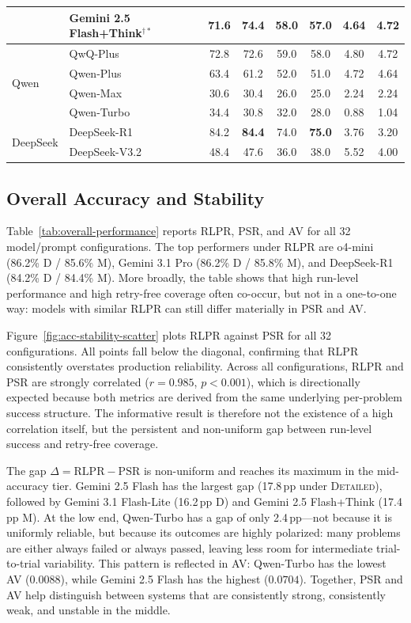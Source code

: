 \documentclass{article}
\begin{document}
\begin{table}[t]
{\begin{tabular}{llcccccc}
  & Gemini 2.5 Flash+Think$^{\dagger*}$ & 71.6 & 74.4 & 58.0 & 57.0 & 4.64 & 4.72 \\
\midrule
\multirow{4}{*}{Qwen}
  & QwQ-Plus   & 72.8 & 72.6 & 59.0 & 58.0 & 4.80 & 4.72 \\
  & Qwen-Plus  & 63.4 & 61.2 & 52.0 & 51.0 & 4.72 & 4.64 \\
  & Qwen-Max   & 30.6 & 30.4 & 26.0 & 25.0 & 2.24 & 2.24 \\
  & Qwen-Turbo & 34.4 & 30.8 & 32.0 & 28.0 & 0.88 & 1.04 \\
\midrule
\multirow{2}{*}{DeepSeek}
  & DeepSeek-R1   & 84.2 & \textbf{84.4} & 74.0 & \textbf{75.0} & 3.76 & 3.20 \\
  & DeepSeek-V3.2 & 48.4 & 47.6 & 36.0 & 38.0 & 5.52 & 4.00 \\
\bottomrule
\end{tabular}
}
\end{table}

\subsection{Overall Accuracy and Stability}
Table~\ref{tab:overall-performance} reports RLPR, PSR, and AV for all 32 model/prompt configurations. The top performers under RLPR are o4-mini (86.2\% D / 85.6\% M), Gemini 3.1 Pro (86.2\% D / 85.8\% M), and DeepSeek-R1 (84.2\% D / 84.4\% M). More broadly, the table shows that high run-level performance and high retry-free coverage often co-occur, but not in a one-to-one way: models with similar RLPR can still differ materially in PSR and AV.

Figure~\ref{fig:acc-stability-scatter} plots RLPR against PSR for all 32 configurations. All points fall below the diagonal, confirming that RLPR consistently overstates production reliability. Across all configurations, RLPR and PSR are strongly correlated ($r=0.985$, $p<0.001$), which is directionally expected because both metrics are derived from the same underlying per-problem success structure. The informative result is therefore not the existence of a high correlation itself, but the persistent and non-uniform gap between run-level success and retry-free coverage.

The gap $\Delta = \mathrm{RLPR} - \mathrm{PSR}$ is non-uniform and reaches its maximum in the mid-accuracy tier. Gemini 2.5 Flash has the largest gap (17.8\,pp under \textsc{Detailed}), followed by Gemini 3.1 Flash-Lite (16.2\,pp D) and Gemini 2.5 Flash+Think (17.4\,pp M). At the low end, Qwen-Turbo has a gap of only 2.4\,pp---not because it is uniformly reliable, but because its outcomes are highly polarized: many problems are either always failed or always passed, leaving less room for intermediate trial-to-trial variability. This pattern is reflected in AV: Qwen-Turbo has the lowest AV ($0.0088$), while Gemini 2.5 Flash has the highest ($0.0704$). Together, PSR and AV help distinguish between systems that are consistently strong, consistently weak, and unstable in the middle.
\end{document}
